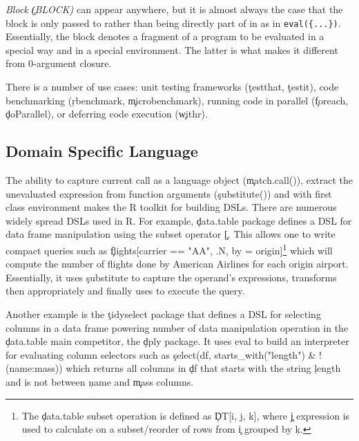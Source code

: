 \documentclass[review,screen,acmsmall,anonymous=true]{acmart}
\newcommand{\authorcomment}[3]{\xspace\textcolor{#1}{{\bf #2} #3}\xspace}
\newcommand{\todo}[1]{\authorcomment{red}{TODO}{#1}}
\begin{document}
\begin{compactitem}[---]
  \item \emph{Block \c{(BLOCK)}} can appear anywhere, but it is almost always
    the case that the block is only passed to \eval rather than being directly
    part of in as in \lstinline|eval({...})|. Essentially, the block denotes a
    fragment of a program to be evaluated in a special way and in a special
    environment. The latter is what makes it different from 0-argument closure.

    There is a number of use cases: unit testing frameworks (\eg \c{testthat},
    \c{testit}), code benchmarking (\eg \c{rbenchmark}, \c{microbenchmark}),
    running code in parallel (\eg \c{foreach}, \c{doParallel}), or deferring
    code execution (\eg \c{withr}).

\end{compactitem}


\subsection{Domain Specific Language}

The ability to capture current call as a language object (\c{match.call()}),
extract the unevaluated expression from function arguments (\c{substitute()})
and \eval with first class environment makes the R toolkit for building DSLs.
There are numerous widely spread DSLs used in R. For example, \c{data.table}
package defines a DSL for data frame manipulation using the subset operator
\c{[}. This allows one to write compact queries such as \c{flights[carrier ==
  "AA", .N, by = origin]}\footnote{The \c{data.table} subset operation is
defined as \c{DT[i, j, k]}, where \c{j} expression is used to calculate on a
subset/reorder of rows from \c{i} grouped by \c{k}.} which will compute the
number of flights done by American Airlines for each origin airport.
Essentially, it uses \c{substitute} to capture the operand's expressions,
transforms then appropriately and finally uses \eval to execute the query.

Another example is the \c{tidyselect} package that defines a DSL for selecting
columns in a data frame powering number of data manipulation operation in the
\c{data.table} main competitor, the \c{dply} package. It uses eval to build an
interpreter for evaluating column selectors such as \c{select(df,
starts\_with("length") \& !(name:mass))} which returns all columns in \c{df}
that starts with the string \c{length} and is not between \c{name} and
\c{mass} columns.
\end{document}
